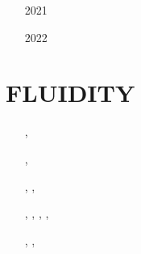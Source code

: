 \begin{small}
\begin{itemize}
\item[2021] \textcite{befh21}
\item[2022] \textcite{dakg22}
\end{itemize}
\end{small}



\section{FLUIDITY}

\begin{small}
\begin{itemize}
\item[\twothousandeleven]      \textcite{dawk11}
\item[\twothousandtwelve]      \textcite{krwd12}
\item[\twothousandfourteen]    \textcite{gagd14},  \textcite{ledg14}
\item[\twothousandsixteen]     \textcite{dalg16},  \textcite{jodc16} 
\item[\twothousandseventeen]   \textcite{hegd17}
\item[\twothousandtwenty]      \textcite{algg20},  \textcite{mapg20}, 
                               \textcite{gatt20}
\item[\twothousandtwentyone]   \textcite{sugm21},  \textcite{kndc21},
                               \textcite{befd21},  \textcite{dudm21},
                               \textcite{gath21} 
\item[\twothousandtwentytwo]   \textcite{cesg22},  \textcite{chdg22a}, \textcite{chdg22b}
\item[\twothousandtwentythree] \textcite{pidh23} 
\item[\twothousandtwentyfour]  \textcite{chdg24} 

\end{itemize}
\end{small}



